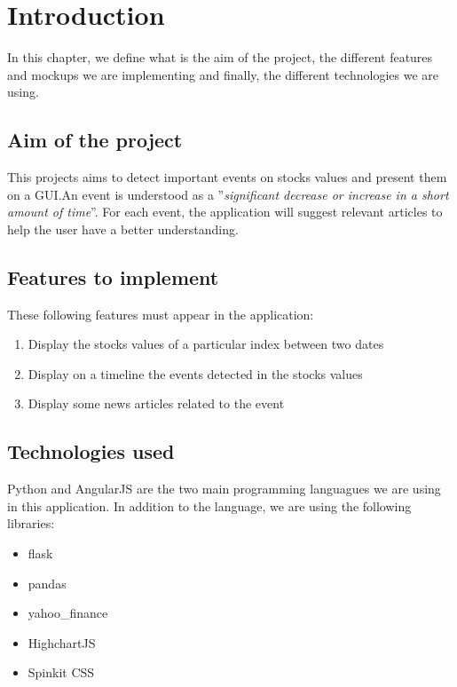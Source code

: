 \chapter{Introduction}
\label{chapter:introduction}
In this chapter, we define what is the aim of the project, the different features and mockups we are implementing and finally, the different technologies we are using.

\section{Aim of the project}
This projects aims to detect important events on stocks values and present them on a GUI.\@ An event is understood as a ''\textit{significant decrease or increase in a short amount of time}''. For each event, the application will suggest relevant articles to help the user have a better understanding.

\section{Features to implement}
\label{sec:intro:features}
These following features must appear in the application:
\begin{enumerate}
    \item Display the stocks values of a particular index between two dates
    \item Display on a timeline the events detected in the stocks values
    \item Display some news articles related to the event
\end{enumerate}

\section{Technologies used}
Python and AngularJS are the two main programming languagues we are using in this application. In addition to the language, we are using the following libraries:
\begin{itemize}
    \item flask
    \item pandas
    \item yahoo\_finance
    \item HighchartJS
    \item Spinkit CSS
\end{itemize}
